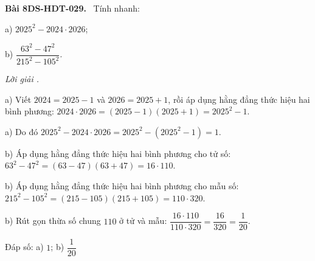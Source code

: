 \documentclass[12pt,a4paper]{article}
\newenvironment{problem}[1][]{\par\medskip\noindent\textbf{Bài #1.}\ }{\par}
\newenvironment{solution}[1][]{\par\noindent\textit{Lời giải #1.}\par}{\par}
\begin{document}
\begin{problem}[8DS-HDT-029]
Tính nhanh:

a) $2025^2 - 2024 \cdot 2026$;

b) $\dfrac{63^2 - 47^2}{215^2 - 105^2}$.

\begin{solution}
a) Viết $2024 = 2025 - 1$ và $2026 = 2025 + 1$, rồi áp dụng hằng đẳng thức hiệu hai bình phương: $2024 \cdot 2026 = (2025 - 1)(2025 + 1) = 2025^2 - 1$.

a) Do đó $2025^2 - 2024 \cdot 2026 = 2025^2 - (2025^2 - 1) = 1$.

b) Áp dụng hằng đẳng thức hiệu hai bình phương cho tử số: $63^2 - 47^2 = (63 - 47)(63 + 47) = 16 \cdot 110$.

b) Áp dụng hằng đẳng thức hiệu hai bình phương cho mẫu số: $215^2 - 105^2 = (215 - 105)(215 + 105) = 110 \cdot 320$.

b) Rút gọn thừa số chung $110$ ở tử và mẫu: $\dfrac{16 \cdot 110}{110 \cdot 320} = \dfrac{16}{320} = \dfrac{1}{20}$.

Đáp số: a) $\boxed{1}$; b) $\boxed{\dfrac{1}{20}}$
\end{solution}
\end{problem}
\end{document}
